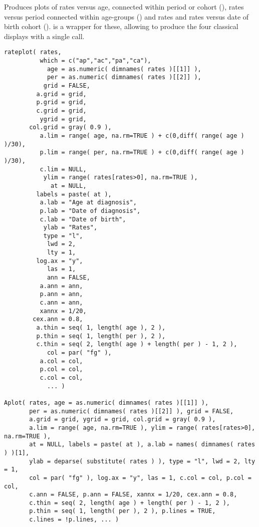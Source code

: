 \begin{Description}\relax
Produces plots of rates versus age, connected within period or cohort
(), rates versus period connected within age-groups
() and rates and rates versus date of birth cohort
().  is a wrapper for these, allowing
to produce the four classical displays with a single call.
\end{Description}
\begin{Usage}
\begin{verbatim}
rateplot( rates,
          which = c("ap","ac","pa","ca"),
            age = as.numeric( dimnames( rates )[[1]] ),
            per = as.numeric( dimnames( rates )[[2]] ),
           grid = FALSE,
         a.grid = grid,
         p.grid = grid,
         c.grid = grid,
          ygrid = grid,
       col.grid = gray( 0.9 ),
          a.lim = range( age, na.rm=TRUE ) + c(0,diff( range( age ) )/30),
          p.lim = range( per, na.rm=TRUE ) + c(0,diff( range( age ) )/30),
          c.lim = NULL, 
           ylim = range( rates[rates>0], na.rm=TRUE ),
             at = NULL,
         labels = paste( at ),
          a.lab = "Age at diagnosis",
          p.lab = "Date of diagnosis",
          c.lab = "Date of birth",
           ylab = "Rates",
           type = "l",
            lwd = 2,
            lty = 1,
         log.ax = "y",
            las = 1,
            ann = FALSE,
          a.ann = ann,
          p.ann = ann,
          c.ann = ann,
          xannx = 1/20,
        cex.ann = 0.8,
         a.thin = seq( 1, length( age ), 2 ),
         p.thin = seq( 1, length( per ), 2 ),
         c.thin = seq( 2, length( age ) + length( per ) - 1, 2 ),
            col = par( "fg" ),
          a.col = col,
          p.col = col,
          c.col = col,
            ... )

Aplot( rates, age = as.numeric( dimnames( rates )[[1]] ),
       per = as.numeric( dimnames( rates )[[2]] ), grid = FALSE,
       a.grid = grid, ygrid = grid, col.grid = gray( 0.9 ),
       a.lim = range( age, na.rm=TRUE ), ylim = range( rates[rates>0], na.rm=TRUE ),
       at = NULL, labels = paste( at ), a.lab = names( dimnames( rates ) )[1],
       ylab = deparse( substitute( rates ) ), type = "l", lwd = 2, lty = 1,
       col = par( "fg" ), log.ax = "y", las = 1, c.col = col, p.col = col,
       c.ann = FALSE, p.ann = FALSE, xannx = 1/20, cex.ann = 0.8,
       c.thin = seq( 2, length( age ) + length( per ) - 1, 2 ),
       p.thin = seq( 1, length( per ), 2 ), p.lines = TRUE,
       c.lines = !p.lines, ... )


\end{verbatim}
\end{Usage}
